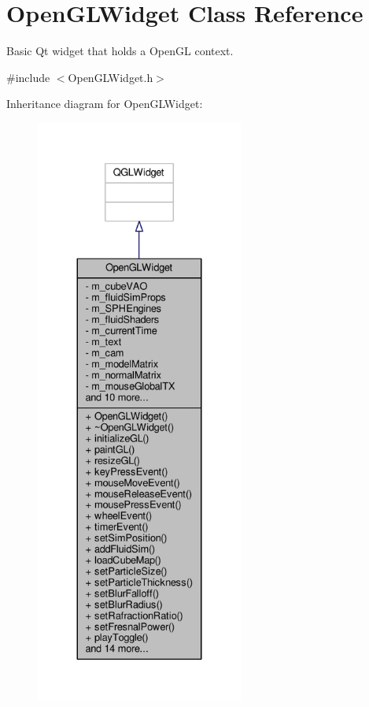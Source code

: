 \hypertarget{class_open_g_l_widget}{\section{Open\-G\-L\-Widget Class Reference}
\label{class_open_g_l_widget}
}


Basic Qt widget that holds a Open\-G\-L context.  




{\ttfamily \#include $<$Open\-G\-L\-Widget.\-h$>$}



Inheritance diagram for Open\-G\-L\-Widget\-:\nopagebreak
\begin{figure}[H]
\begin{center}
\leavevmode
\includegraphics[height=550pt]{class_open_g_l_widget__inherit__graph}
\end{center}
\end{figure}


